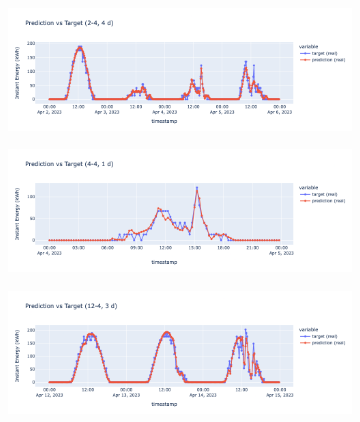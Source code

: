 
\begin{figure}[H]
	\centering
	\begin{subfigure}{\textwidth}
		\centering
		\includegraphics[width=\textwidth]{chapters/3_models/imgs/grrun/eval/grruneval24.png}
		\caption{}
	\end{subfigure}
	\begin{subfigure}{\textwidth}
		\centering
		\includegraphics[width=\textwidth]{chapters/3_models/imgs/grrun/eval/grruneval44.png}
		\caption{}
	\end{subfigure}
	\begin{subfigure}{\textwidth}
		\centering
		\includegraphics[width=\textwidth]{chapters/3_models/imgs/grrun/eval/grruneval124.png}

\end{subfigure}
\end{figure}
